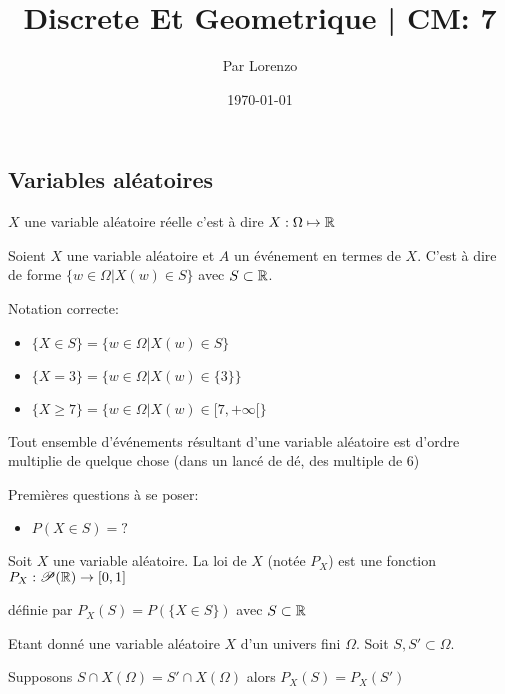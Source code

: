 \documentclass[a4paper, 12pt]{article}
\title{Discrete Et Geometrique | CM: 7}
\author{Par Lorenzo}
\date{\today}
\begin{document}
\maketitle

\subsection{Variables aléatoires}

\begin{definition}
    $X$ une variable aléatoire réelle c'est à dire $X: \Omega \mapsto \mathbb{R}$
\end{definition}

\begin{definition}
    Soient $X$ une variable aléatoire et $A$ un événement en termes de $X$.
    C'est à dire de forme $\{ w \in \Omega | X(w) \in S\}$ avec $S \subset \mathbb{R}$.

    Notation correcte:
    \begin{itemize}
        \item $\{X \in S\} = \{w \in \Omega | X(w) \in S\}$
        \item $\{X = 3\} = \{w \in \Omega | X(w) \in \{3\}\}$
        \item $\{X \geq 7\} = \{w \in \Omega | X(w) \in [7, +\infty[\}$
    \end{itemize}
\end{definition}

\begin{remark}
    Tout ensemble d'événements résultant d'une variable aléatoire est d'ordre multiplie de quelque chose (dans un lancé de dé, des multiple de 6)
\end{remark}

\begin{remark}
    Premières questions à se poser:
    \begin{itemize}
        \item $P(X  \in S) = ?$
    \end{itemize}
\end{remark}

\begin{definition}
    Soit $X$ une variable aléatoire. La loi de $X$ (notée $P_X$)
    est une fonction $P_X: \mathscr{P}(\mathbb{R}) \to [0, 1]$

    définie par $P_X(S) = P(\{X \in S\})$ avec $S \subset \mathbb{R}$
\end{definition}

\begin{proposition}
    Etant donné une variable aléatoire $X$ d'un univers fini $\Omega$.
    Soit $S, S' \subset \Omega$.

    Supposons $S \cap X(\Omega) = S' \cap X(\Omega)$ alors $P_X(S) = P_X(S')$
\end{proposition}
\end{document}
